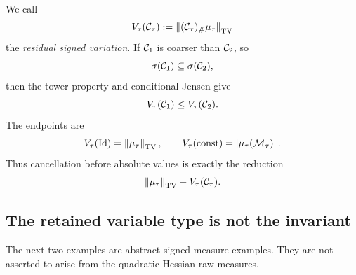 We call
\begin{equation}
  V_\tau(\mathcal C_\tau)
  :=
  \left\lVert(\mathcal C_\tau)_\#\mu_\tau\right\rVert_{\mathrm{TV}}
  \label{eq:residual-variation-def}
\end{equation}
the \emph{residual signed variation}. If $\mathcal C_1$ is coarser than $\mathcal C_2$, so
\begin{equation*}
  \sigma(\mathcal C_1)
  \subseteq
  \sigma(\mathcal C_2),
\end{equation*}
then the tower property and conditional Jensen give
\begin{equation}
  V_\tau(\mathcal C_1)
  \leq
  V_\tau(\mathcal C_2).
  \label{eq:residual-monotonicity}
\end{equation}
The endpoints are
\begin{equation}
  V_\tau(\operatorname{Id})
  =
  \left\lVert\mu_\tau\right\rVert_{\mathrm{TV}},
  \qquad
  V_\tau(\mathrm{const})
  =
  \left|\mu_\tau(\mathcal M_\tau)\right|.
  \label{eq:residual-endpoints}
\end{equation}
Thus cancellation before absolute values is exactly the reduction
\begin{equation*}
  \left\lVert\mu_\tau\right\rVert_{\mathrm{TV}}
  -
  V_\tau(\mathcal C_\tau).
\end{equation*}

\subsection{The retained variable type is not the invariant}

The next two examples are abstract signed-measure examples. They are not asserted to arise from the quadratic-Hessian raw measures.

